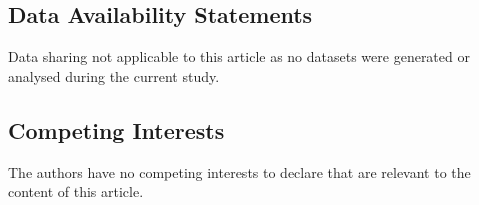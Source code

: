 \documentclass[12pt]{amsart}
\theoremstyle{plain}
\theoremstyle{definition}
\begin{document}
\subsection*{Data Availability Statements}
Data sharing not applicable to this article as no datasets were generated or analysed during the current study.

\subsection*{Competing Interests} The authors have no competing interests to declare that are relevant to the content of this article.






\end{document}
